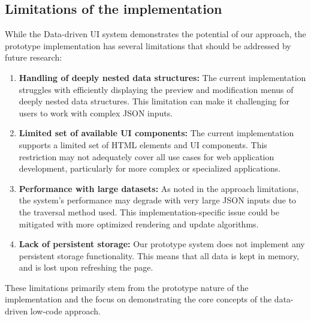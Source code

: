 \subsection{Limitations of the implementation}
While the Data-driven UI system demonstrates the potential of our approach,
the prototype implementation has several limitations that should be addressed by future research:
\begin{enumerate}
	\item \textbf{Handling of deeply nested data structures:}
	      The current implementation struggles with efficiently displaying the preview and modification menus of deeply nested data structures.
	      This limitation can make it challenging for users to work with complex JSON inputs.
	\item \textbf{Limited set of available UI components:} The current implementation supports a limited set of HTML elements and UI components.
	      This restriction may not adequately cover all use cases for web application development, particularly for more complex or specialized applications.
	\item \textbf{Performance with large datasets:}
	      As noted in the approach limitations,
	      the system's performance may degrade with very large JSON inputs due to the traversal method used.
	      This implementation-specific issue could be mitigated with more optimized rendering and update algorithms.
	\item \textbf{Lack of persistent storage:}
	      Our prototype system does not implement any persistent storage functionality.
	      This means that all data is kept in memory, and is lost upon refreshing the page.

\end{enumerate}
These limitations primarily stem from the prototype nature of the implementation and the focus on demonstrating the core concepts of the data-driven low-code approach.

\clearpage

